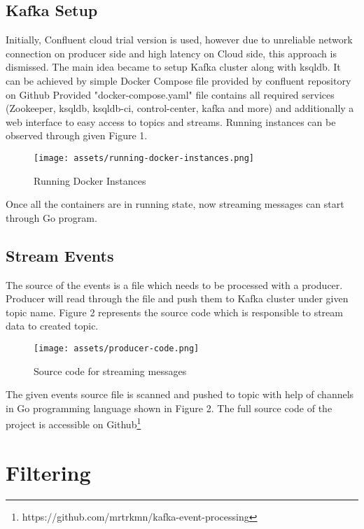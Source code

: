 \documentclass[sigplan,screen]{acmart}
\begin{document}
\subsection{Kafka Setup}
Initially, Confluent cloud\cite{confluent-cloud} trial version is used, however due to unreliable network connection on producer side and high latency on Cloud side, this approach is dismissed. 
The main idea became to setup Kafka cluster along with ksqldb. It can be achieved by simple Docker Compose file provided by confluent repository on Github\cite{cp-all-in-one}
Provided "docker-compose.yaml" file contains all required services (Zookeeper, ksqldb, ksqldb-ci, control-center, kafka and more) and additionally a web interface to easy access to topics and streams. Running instances can be observed through given Figure 1. 
\begin{figure}[H]
    \centerline{\texttt{[image: assets/running-docker-instances.png]}}
    \caption{Running Docker Instances}
    \label{fig}
\end{figure}
Once all the containers are in running state, now streaming messages can start through Go program. 
\subsection{Stream Events}
The source of the events is a file which needs to be processed with a producer. Producer will read through the file and push them to Kafka cluster under given topic name. Figure 2 represents the source code which is responsible to stream data to created topic. 
\begin{figure}[H]
    \centerline{\texttt{[image: assets/producer-code.png]}}
    \caption{Source code for streaming messages}
    \label{fig}
\end{figure}
The given events source file is scanned and pushed to topic with help of channels in Go programming language shown in Figure 2. The full source code of the project is accessible on Github\footnote{https://github.com/mrtrkmn/kafka-event-processing}

\section{Filtering}
\end{document}
